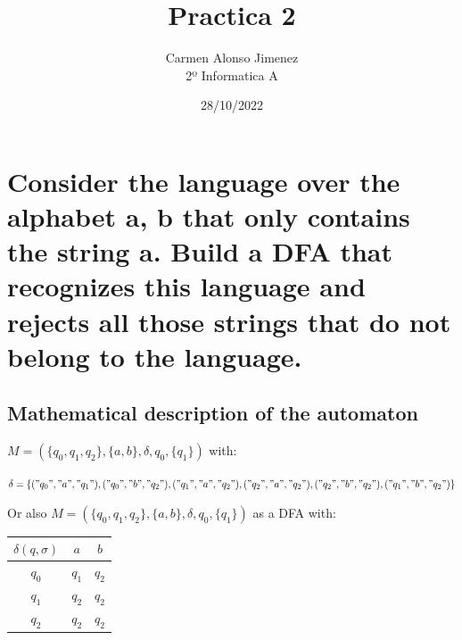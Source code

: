 \documentclass[11pt]{article}\title{\textbf{Practica 2}}
\author{Carmen Alonso Jimenez\\
		2º Informatica A}
\date{28/10/2022}
\begin{document}
\maketitle
\thispagestyle{plain}
\setlength{\parskip}{8pt}

\section{Consider the language over the alphabet {a, b} that only contains the string a. Build a DFA that recognizes this language and rejects all those strings that do not belong to the language.} 

\subsection{Mathematical description of the automaton}


	$M=(\{q_0, q_1, q_2\},\{a, b\},\delta,q_0,\{q_1\})$ with: 

$\delta = \{("q_0","a","q_1"), ("q_0","b","q_2"), ("q_1","a","q_2"),
	("q_2","a","q_2"),  ("q_2","b","q_2"), ("q_1","b","q_2")\}$

Or also $M=(\{q_0, q_1, q_2\},\{a, b\},\delta,q_0,\{q_1\})$ as a DFA with:\\

\begin{table}[h!]
\begin{tabular}{c|c|c}
  $\delta(q,\sigma)$ & $a$ & $b$\\
  \hline
  $q_0$& $q_1$ & $q_2$\\
  \hline
  $q_1$& $q_2$ & $q_2$\\
  \hline
  $q_2$& $q_2$ & $q_2$
\end{tabular}
\end{table}


\begin{center}
\end{center}
\end{document}
